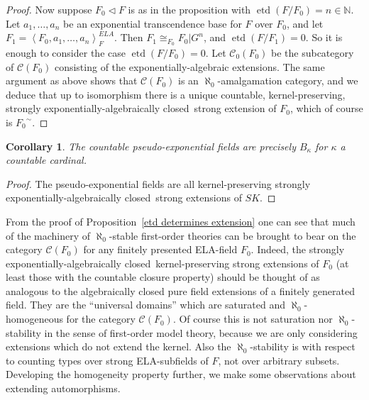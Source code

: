 \documentclass[12pt]{amsart}
\newtheorem{cor}[prop]{Corollary}
\theoremstyle{definition}
\begin{document}
\begin{proof}
Now suppose $F_0 {\ensuremath{\lhd}} F$ is as in the proposition with $\operatorname{etd}(F/F_0) = n \in {\ensuremath{\mathbb{N}}}$. Let $a_1,\ldots,a_n$ be an exponential transcendence base for $F$ over $F_0$, and let $F_1 = {\ensuremath{\left\langle {F_0,a_1,\ldots,a_n} \right\rangle}}^{ELA}_F$. Then $F_1 {\cong}_{F_0} F_0|G^n$, and $\operatorname{etd}(F/F_1) = 0$. So it is enough to consider the case $\operatorname{etd}(F/F_0) = 0$. Let ${\ensuremath{\mathcal{C}}}_0(F_0)$ be the subcategory of ${\ensuremath{\mathcal{C}}}(F_0)$ consisting of the exponentially-algebraic extensions. The same argument as above shows that ${\ensuremath{\mathcal{C}}}(F_0)$ is an $\aleph_0$-amalgamation category, and we deduce that up to isomorphism there is a unique countable, kernel-preserving, {strongly exponentially-algebraically closed}\ strong extension of $F_0$, which of course is ${\ensuremath{{{F_0}}^\sim}}$.
\end{proof}

\begin{cor}
The countable pseudo-exponential fields are precisely $B_\kappa$ for $\kappa$ a countable cardinal. 
\end{cor}
\begin{proof}
The pseudo-exponential fields are all kernel-preserving {strongly exponentially-algebraically closed}\ strong extensions of $SK$.
\end{proof}

From the proof of Proposition~\ref{etd determines extension} one can see that much of the machinery of $\aleph_0$-stable first-order theories can be brought to bear on the category ${\ensuremath{\mathcal{C}}}(F_0)$ for any finitely presented ELA-field $F_0$. Indeed, the {strongly exponentially-algebraically closed}\ kernel-preserving strong extensions of $F_0$ (at least those with the countable closure property) should be thought of as analogous to the algebraically closed pure field extensions of a finitely generated field. They are the ``universal domains'' which are saturated and $\aleph_0$-homogeneous for the category ${\ensuremath{\mathcal{C}}}(F_0)$. Of course this is not saturation nor $\aleph_0$-stability in the sense of first-order model theory, because we are only considering extensions which do not extend the kernel. Also the $\aleph_0$-stability is with respect to counting types over strong ELA-subfields of $F$, not over arbitrary subsets. Developing the homogeneity property further, we make some observations about extending automorphisms.
\end{document}
